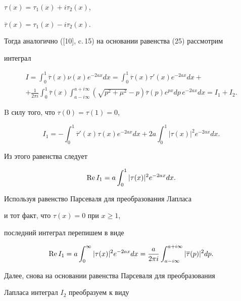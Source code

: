 \begin{pf}
$\tau (x)=\tau_1(x)+i\tau_2(x)$,


$\overline {\tau }(x)=\tau_1(x)-i\tau_2(x)$.


Тогда аналогично ([10], c.\,15) на основании равенства (25) рассмотрим


интеграл


\begin{multline}


I=\int_0^1\overline {\tau }(x)\nu (x)e^{-2ax}dx=


\int_0^1\overline {\tau }(x)\tau '(x)e^{-2ax}dx+ \\


%


+\frac {1}{2\pi i}\int_0^1\overline {\tau }(x)


\int_{a-i\infty }^{a+i\infty }(\sqrt {p^2+\mu ^2}-p)


\overline {\tau }(p) e^{px}dp\,e^{-2ax}dx=I_1+I_2.


\end{multline}


B силу того, что $\tau (0)=\tau (1)=0$,


\begin{equation}


I_1=-\int_0^1\overline \tau{}'(x)\tau (x) e^{-2ax}dx 


+2a\int_0^1|\tau (x)|^2e^{-2ax}dx.


\end{equation}


Из этого равенства следует


$$


\re I_1=a\int_0^1|\tau (x)|^2e^{-2ax}dx.


$$


Используя равенство Парсеваля для преобразования Лапласа


и тот факт, что $\tau (x)=0$ при $x\ge 1$,


последний интеграл перепишем в виде


\begin{equation}


\re I_1=a\int_0^\infty |\tau (x)|^2e^{-2ax}dx=\frac {a}{2\pi i}


\int_{a-i\infty }^{a+i\infty } |\overline {\tau }(p)|^2dp.


\end{equation}


Далее, снова на основании равенства Парсеваля для преобразования


Лапласа интеграл $I_2$ преобразуем к виду



\end{pf}
